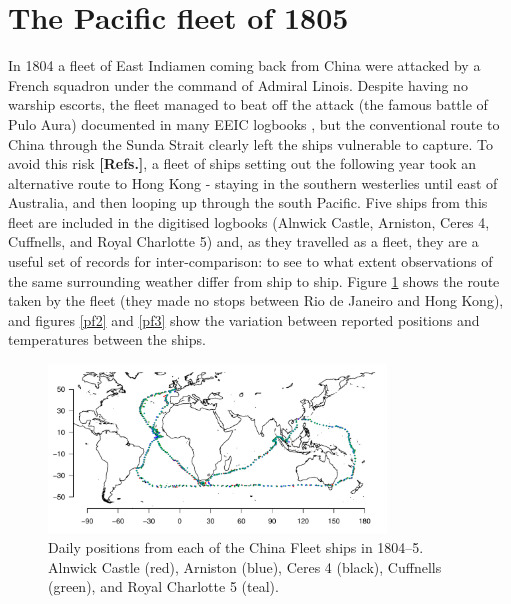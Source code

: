 \documentclass[CP]{copernicus}
\begin{document}
\section{The Pacific fleet of 1805}

In 1804 a fleet of East Indiamen coming back from China were attacked by a French squadron under the command of Admiral Linois. Despite having no warship escorts, the fleet managed to beat off the attack (the famous battle of Pulo Aura) documented in many EEIC logbooks \citep{rodger04}, but the conventional route to China through the Sunda Strait clearly left the ships vulnerable to capture. To avoid this risk {\bf[Refs.]}, a fleet of ships setting out the following year took an alternative route to Hong Kong - staying in the southern westerlies until east of Australia, and then looping up through the south Pacific. Five ships from this fleet are included in the digitised logbooks (Alnwick Castle, Arniston, Ceres 4, Cuffnells, and Royal Charlotte 5) and, as they travelled as a fleet, they are a useful set of records for inter-comparison: to see to what extent observations of the same surrounding weather differ from ship to ship. Figure \ref{pf1} shows the route taken by the fleet (they made no stops between Rio de Janeiro and Hong Kong), and figures \ref{pf2} and \ref{pf3} show the variation between reported positions and temperatures between the ships.

\begin{figure}[!hbp]
\begin{center}
\includegraphics[angle=0, width=0.8\textwidth]{./../../../analysis/south_pacific/figures/all_route}
\caption{Daily positions from each of the China Fleet ships in 1804--5. Alnwick Castle (red), Arniston (blue), Ceres 4 (black), Cuffnells (green), and Royal Charlotte 5 (teal).}
\label{pf1}
\end{center}
\end{figure}
\end{document}
